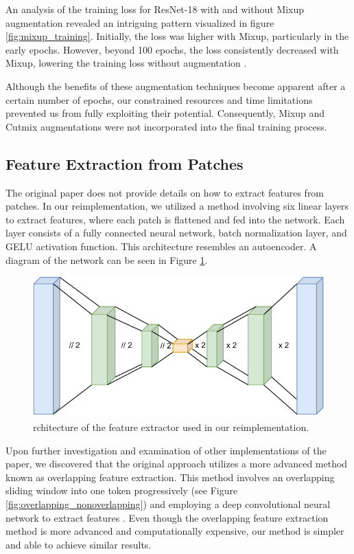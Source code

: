 \documentclass[sigconf, nonacm]{acmart}
\begin{document}
An analysis of the training loss for ResNet-18 with and without Mixup augmentation revealed an intriguing pattern visualized in figure \ref{fig:mixup_training}. Initially, the loss was higher with Mixup, particularly in the early epochs. However, beyond 100 epochs, the loss consistently decreased with Mixup, lowering the training loss without augmentation \cite{mixupwithouthesitation}.

Although the benefits of these augmentation techniques become apparent after a certain number of epochs, our constrained resources and time limitations prevented us from fully exploiting their potential. Consequently, Mixup and Cutmix augmentations were not incorporated into the final training process.

\subsection{Feature Extraction from Patches}
The original paper does not provide details on how to extract features from patches. In our reimplementation, we utilized a method involving six linear layers to extract features, where each patch is flattened and fed into the network. Each layer consists of a fully connected neural network, batch normalization layer, and GELU activation function. This architecture resembles an autoencoder. A diagram of the network can be seen in Figure \ref{fig:feature_extractor_arch}.

\begin{figure}[t]
  \centering
  \includegraphics[width=0.9\linewidth]{figures/feature_extractor_arch.pdf}
  \caption{rchitecture of the feature extractor used in our reimplementation.}
  \label{fig:feature_extractor_arch}
\end{figure}

Upon further investigation and examination of other implementations of the paper, we discovered that the original approach utilizes a more advanced method known as overlapping feature extraction. This method involves an overlapping sliding window into one token progressively (see Figure \ref{fig:overlapping_nonoverlapping}) and employing a deep convolutional neural network to extract features \cite{pvtv2}. Even though the overlapping feature extraction method is more advanced and computationally expensive, our method is simpler and able to achieve similar results.
\end{document}

